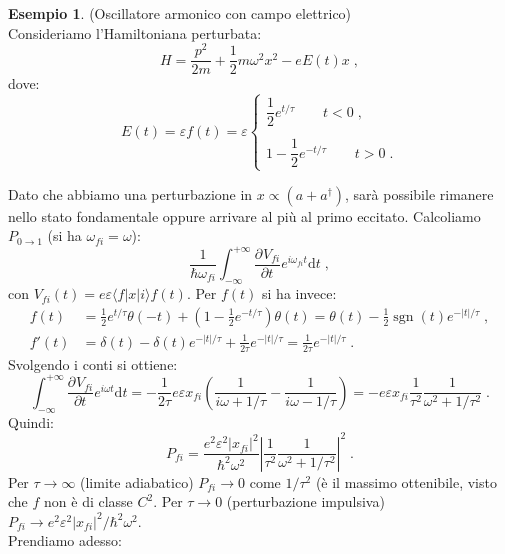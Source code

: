 \documentclass[10pt,a4paper]{report}
\theoremstyle{definition}
\newtheorem{exm}{Esempio}
\newcommand{\pdev}[3][]{\frac{\partial^{#1} #2}{\partial #3^{#1}}}
\numberwithin{equation}{section}
\newcommand{\diff}[1][]{\mathrm{d}#1}
\newcommand{\bra}{\langle}
\newcommand{\ket}{\rangle}
\newcommand{\adj}[1]{#1^{\dagger}}
\begin{document}
\begin{exm} (Oscillatore armonico con campo elettrico) \\
Consideriamo l'Hamiltoniana perturbata:
\begin{equation*}
H=\frac{p^2}{2m}+\frac{1}{2}m\omega^2x^2-eE(t)x\;,
\end{equation*}
dove:
\begin{equation*}
E(t)=\varepsilon f(t)=\varepsilon\begin{cases}
\dfrac{1}{2}e^{t/\tau}\qquad t<0\;, \\
\\
1-\dfrac{1}{2}e^{-t/\tau}\qquad t>0\;.
\end{cases}
\end{equation*}

Dato che abbiamo una perturbazione in $x\propto (a+\adj{a})$, sarà possibile rimanere nello stato fondamentale oppure arrivare al più al primo eccitato. Calcoliamo $P_{0\to 1}$ (si ha $\omega_{fi}=\omega$):
\begin{equation*}
\frac{1}{\hbar\omega_{fi}}\int_{-\infty}^{+\infty} \pdev{V_{fi}}{t}e^{i\omega_{fi}t}\diff{t}\;,
\end{equation*}
con $V_{fi}(t)=e\varepsilon\bra f|x|i\ket f(t)$. Per $f(t)$ si ha invece:
\begin{align*}
f(t) &= \frac{1}{2}e^{t/\tau}\theta(-t)+\left(1-\frac{1}{2}e^{-t/\tau}\right)\theta(t)= \theta(t)-\frac{1}{2}\operatorname{sgn}(t)e^{-|t|/\tau}\;, \\
f'(t) &= \delta(t)-\delta(t)e^{-|t|/\tau}+\frac{1}{2\tau}e^{-|t|/\tau}=\frac{1}{2\tau}e^{-|t|/\tau}\;.
\end{align*}
Svolgendo i conti si ottiene:
\begin{equation*}
\int_{-\infty}^{+\infty}\pdev{V_{fi}}{t}e^{i\omega t}\diff{t}=-\frac{1}{2\tau}e\varepsilon x_{fi}\left(\frac{1}{i\omega +1/\tau}-\frac{1}{i\omega-1/\tau}\right)=-e\varepsilon x_{fi}\frac{1}{\tau^2}\frac{1}{\omega^2+1/\tau^2}\;.
\end{equation*}
Quindi:
\begin{equation*}
P_{fi}=\frac{e^2\varepsilon^2|x_{fi}|^2}{\hbar^2\omega^2}\left|\frac{1}{\tau^2}\frac{1}{\omega^2+1/\tau^2}\right|^2\;.
\end{equation*}
Per $\tau\to\infty$ (limite adiabatico) $P_{fi}\to0$ come $1/\tau^2$ (è il massimo ottenibile, visto che $f$ non è di classe $C^2$. Per $\tau\to 0$ (perturbazione impulsiva) $P_{fi}\to e^2\varepsilon^2|x_{fi}|^2/\hbar^2\omega^2$. \\
Prendiamo adesso:

\end{exm}
\end{document}
